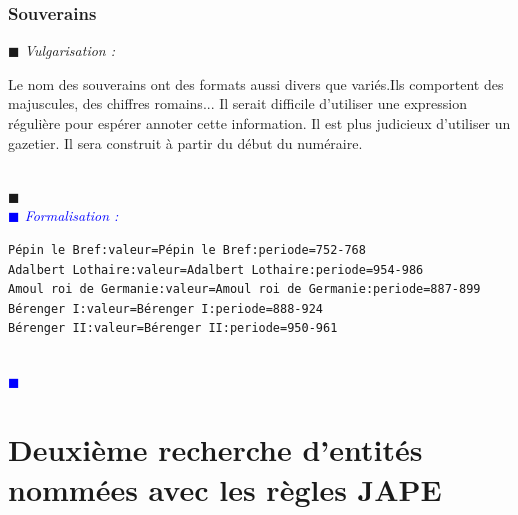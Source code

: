\documentclass[a4paper, 11pt]{report}
\newenvironment{vulgarisation}
    {
    \textit{\textcolor{dark-blue}{$\blacksquare$  Vulgarisation : \\}}

    }
    {
    ~\\\textcolor{dark-blue}{$\blacksquare$}\\
    }
\newenvironment{formalisation}
    {
    \textit{\textcolor{blue}{$\blacksquare$  Formalisation : \\}}
    }
    {
    ~\\\textcolor{blue}{$\blacksquare$}\\
    }
\begin{document}
\subsubsection{Souverains}
\begin{vulgarisation}
	Le nom des souverains ont des formats aussi divers que variés.Ils comportent des majuscules, des chiffres romains... Il serait difficile d'utiliser une expression régulière pour espérer annoter cette information. Il est plus judicieux d'utiliser un gazetier. Il sera construit à partir du début du numéraire. 
\end{vulgarisation}
\begin{formalisation}
\begin{verbatim}
Pépin le Bref:valeur=Pépin le Bref:periode=752-768
Adalbert Lothaire:valeur=Adalbert Lothaire:periode=954-986
Amoul roi de Germanie:valeur=Amoul roi de Germanie:periode=887-899
Bérenger I:valeur=Bérenger I:periode=888-924
Bérenger II:valeur=Bérenger II:periode=950-961
\end{verbatim}
\end{formalisation}

	\section{Deuxième recherche d'entités nommées avec les règles JAPE}
\end{document}
